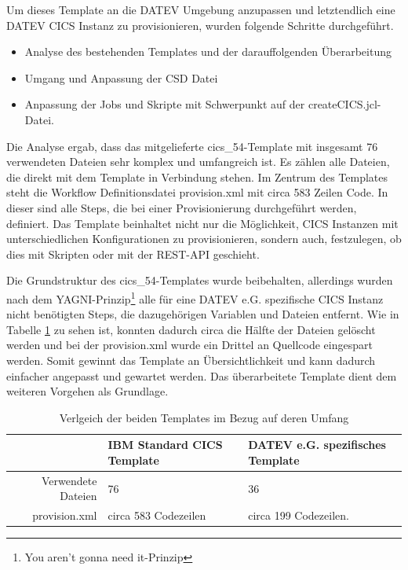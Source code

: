 Um dieses Template an die DATEV Umgebung anzupassen und letztendlich eine \glqq DATEV CICS Instanz \grqq{} zu provisionieren, wurden folgende Schritte durchgeführt.

\begin{samepage}
\begin{itemize}
\item Analyse des bestehenden Templates und der darauffolgenden Überarbeitung 
\item Umgang und Anpassung der CSD Datei
\item Anpassung der Jobs und Skripte mit Schwerpunkt auf der \glqq createCICS.jcl\grqq-Datei.
\end{itemize}
\end{samepage}

Die Analyse ergab, dass das mitgelieferte \glqq cics\_54\grqq-Template mit insgesamt 76 verwendeten Dateien sehr komplex und umfangreich ist.
Es zählen alle Dateien, die direkt mit dem Template in Verbindung stehen.
Im Zentrum des Templates steht die Workflow Definitionsdatei \glqq provision.xml \grqq{} mit circa 583 Zeilen Code.
In dieser sind alle Steps, die bei einer Provisionierung durchgeführt werden, definiert.
Das Template beinhaltet nicht nur die Möglichkeit, CICS Instanzen mit unterschiedlichen Konfigurationen zu provisionieren, sondern auch, festzulegen, ob dies mit Skripten oder mit der REST-API geschieht.

Die Grundstruktur des \glqq cics\_54\grqq-Templates wurde beibehalten, allerdings wurden nach dem \glqq YAGNI\grqq-Prinzip\footnote{\glqq You aren't gonna need it\glqq-Prinzip} alle für eine DATEV e.G. spezifische CICS Instanz nicht benötigten Steps, die dazugehörigen Variablen und Dateien entfernt.
Wie in  Tabelle \ref{tab:vglTemps} zu sehen ist, konnten dadurch circa die Hälfte der Dateien gelöscht werden und bei der provision.xml wurde ein Drittel an Quellcode eingespart werden.
Somit gewinnt das Template an Übersichtlichkeit und kann dadurch einfacher angepasst und gewartet werden.
Das überarbeitete Template dient dem weiteren Vorgehen als Grundlage.

\begin{table}[h]
\centering
\begin{tabularx}{\textwidth}{r|X|X}
& IBM Standard CICS Template & DATEV e.G. spezifisches Template \\
\hline
Verwendete Dateien & 76 & 36 \\
\hline
provision.xml & circa 583 Codezeilen & circa 199 Codezeilen. \\
\end{tabularx}
\caption{Verlgeich der beiden Templates im Bezug auf deren Umfang}
\label{tab:vglTemps}
\end{table}

